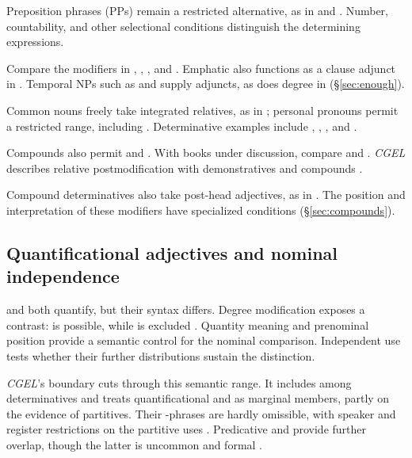\documentclass[12pt]{article}
\begin{document}
Preposition phrases (PPs) remain a restricted alternative, as in  and  \citep[356]{huddleston2002}. Number, countability, and other selectional conditions distinguish the determining expressions.

Compare the modifiers in , , , and . Emphatic  also functions as a clause adjunct in  \citep[1496--1497]{huddleston2002}. Temporal NPs such as  and  supply adjuncts, as does degree  in  (§\ref{sec:enough}).

Common nouns freely take integrated relatives, as in ; personal pronouns permit a restricted range, including  \citep[430]{huddleston2002}. Determinative examples include , , , and .

Compounds also permit  and . With books under discussion, compare  and . \textit{CGEL} describes relative postmodification with demonstratives and compounds \citep[414, 422--423]{huddleston2002}.

Compound determinatives also take post-head adjectives, as in . The position and interpretation of these modifiers have specialized conditions (§\ref{sec:compounds}).

\subsection{Quantificational adjectives and nominal independence}\label{sec:quant-controls}

 and  both quantify, but their syntax differs. Degree modification exposes a contrast:  is possible, while  is excluded \citep[539--540]{huddleston2002}. Quantity meaning and prenominal position provide a semantic control for the nominal comparison. Independent use tests whether their further distributions sustain the distinction.

\textit{CGEL}'s boundary cuts through this semantic range. It includes  among determinatives and treats quantificational  and  as marginal members, partly on the evidence of partitives. Their -phrases are hardly omissible, with speaker and register restrictions on the partitive uses \citep[392--393, 411--413]{huddleston2002}. Predicative  and  provide further overlap, though the latter is uncommon and formal \citep[392, 395--396]{huddleston2002}.
\end{document}
